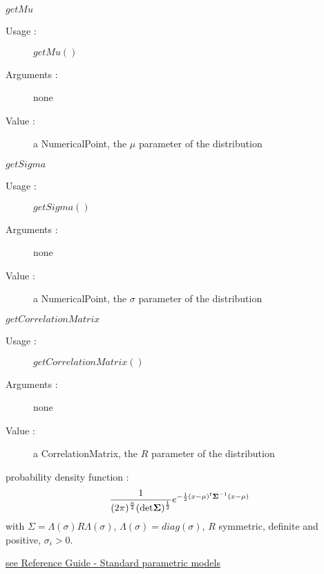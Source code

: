\begin{description}
\item[Some methods :] \rule{0pt}{1em}
  \begin{description}
  \item $getMu$
    \begin{description}
    \item[Usage :] $getMu()$
    \item[Arguments :] none
    \item[Value :]  a NumericalPoint,  the $\mu$ parameter of the  distribution
    \end{description}
    \bigskip
  \item $getSigma$
    \begin{description}
    \item[Usage :] $getSigma()$
    \item[Arguments :] none
    \item[Value :]  a NumericalPoint,  the $\sigma$ parameter of the  distribution
    \end{description}
    \bigskip
  \item $getCorrelationMatrix$
    \begin{description}
    \item[Usage :] $getCorrelationMatrix()$
    \item[Arguments :] none
    \item[Value :]  a CorrelationMatrix,  the $R$ parameter of the  distribution
    \end{description}
  \end{description}

\item[Details :]
  \begin{description}
  \item probability density function :
    $$\displaystyle
    \frac{1}
    {
      \displaystyle (2\pi)^{\frac{n}{2}}(\mathrm{det}\mathbf{\Sigma})^{\frac{1}{2}}
    }
    \displaystyle e^{-\frac{1}{2}{{(x-\mu)}^t}\mathbf{\Sigma}^{-1}(x-\mu)}
    $$
    with $\Sigma = \Lambda(\sigma) R \Lambda(\sigma)$, $\Lambda(\sigma) = diag(\sigma)$, $R$ symmetric, definite and positive, $\sigma_i >0$.

  \end{description}

\item[Links :]  \rule{0pt}{1em}
  \href{OpenTURNS_ReferenceGuide.pdf}{see Reference Guide - Standard parametric models}

\end{description}


